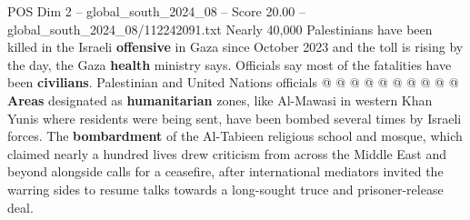 \begin{textsample}{POS Dim 2 – global\_south\_2024\_08 – Score 20.00 – global\_south\_2024\_08/112242091.txt}
Nearly 40,000 Palestinians have been killed in the Israeli \textbf{offensive} in Gaza since October 2023 and the toll is rising by the day, the Gaza \textbf{health} ministry says.
Officials say most of the fatalities have been \textbf{civilians}.
Palestinian and United Nations officials @ @ @ @ @ @ @ @ @ @ \textbf{Areas} designated as \textbf{humanitarian} zones, like Al-Mawasi in western Khan Yunis where residents were being sent, have been bombed several times by Israeli forces.
The \textbf{bombardment} of the Al-Tabieen religious school and mosque, which claimed nearly a hundred lives drew criticism from across the Middle East and beyond alongside calls for a ceasefire, after international mediators invited the warring sides to resume talks towards a long-sought truce and prisoner-release deal.

\end{textsample}
